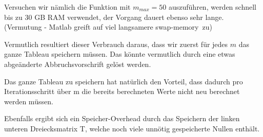 \documentclass[11pt,titlepage]{article}
\begin{document}
		 Versuchen wir nämlich die Funktion mit $m_{max} = 50$ auszuführen, werden schnell bis zu 30 GB RAM verwendet, der Vorgang dauert ebenso sehr lange. (Vermutung - Matlab greift auf viel langsamere \glqq swap-memory\grqq \, zu)
		 	 
		 Vermutlich resultiert dieser Verbrauch daraus, dass wir zuerst für jedes $m$ das ganze Tableau speichern müssen. Das könnte vermutlich durch eine etwas abgeänderte Abbruchsvorschrift gelöst werden.
		 
		 Das ganze Tableau zu speichern hat natürlich den Vorteil, dass dadurch pro Iterationsschritt über m die bereits berechneten Werte nicht neu berechnet werden müssen.
		 
		 Ebenfalls ergibt sich ein Speicher-Overhead durch das Speichern der linken unteren Dreiecksmatrix T, welche noch viele unnötig gespeicherte Nullen enthält.
		
			
\end{document}
